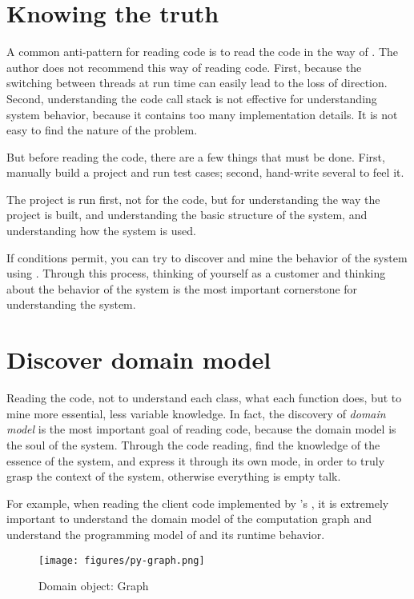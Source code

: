 \section{Knowing the truth}
\begin{content}
A common anti-pattern for reading code is to read the code in the way of . The author does not recommend this way of reading code. First, because the switching between threads at run time can easily lead to the loss of direction. Second, understanding the code call stack is not effective for understanding system behavior, because it contains too many implementation details. It is not easy to find the nature of the problem.

But before reading the code, there are a few things that must be done. First, manually build a project and run test cases; second, hand-write several  to feel it.

The project is run first, not for the  code, but for understanding the way the project is built, and understanding the basic structure of the system, and understanding how the system is used.

If conditions permit, you can try to discover and mine the behavior of the system using . Through this process, thinking of yourself as a customer and thinking about the behavior of the system is the most important cornerstone for understanding the system.
\end{content}


\section{Discover domain model}
\begin{content}
Reading the code, not to understand each class, what each function does, but to mine more essential, less variable knowledge. In fact, the discovery of \emph{domain model} is the most important goal of reading code, because the domain model is the soul of the system. Through the code reading, find the knowledge of the essence of the system, and express it through its own mode, in order to truly grasp the context of the system, otherwise everything is empty talk.

For example, when reading the client code implemented by \tf{}'s , it is extremely important to understand the domain model of the computation graph and understand the programming model of  and its runtime behavior.

\begin{figure}[!htbp]
  \centering
  \texttt{[image: figures/py-graph.png]}
  \caption{Domain object: Graph}
  \label{fig:py-graph}
\end{figure}
\end{content}


